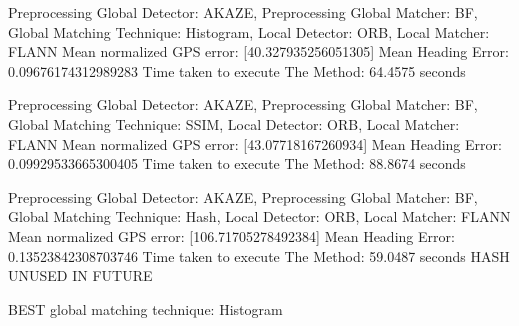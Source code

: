 Preprocessing Global Detector: AKAZE, Preprocessing Global Matcher: BF, Global Matching Technique: Histogram, Local Detector: ORB, Local Matcher: FLANN
Mean normalized GPS error: [40.327935256051305]
Mean Heading Error: 0.09676174312989283
Time taken to execute The Method: 64.4575 seconds


Preprocessing Global Detector: AKAZE, Preprocessing Global Matcher: BF, Global Matching Technique: SSIM, Local Detector: ORB, Local Matcher: FLANN
Mean normalized GPS error: [43.07718167260934]
Mean Heading Error: 0.09929533665300405
Time taken to execute The Method: 88.8674 seconds


Preprocessing Global Detector: AKAZE, Preprocessing Global Matcher: BF, Global Matching Technique: Hash, Local Detector: ORB, Local Matcher: FLANN
Mean normalized GPS error: [106.71705278492384]
Mean Heading Error: 0.13523842308703746
Time taken to execute The Method: 59.0487 seconds
HASH UNUSED IN FUTURE

BEST global matching technique: Histogram